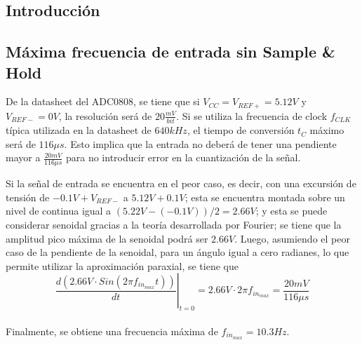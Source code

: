 



\subsection{Introducción}

\subsection{Máxima frecuencia de entrada sin Sample \& Hold}

De la datasheet del ADC0808, se tiene que si $V_{CC} = V_{REF+} = 5.12V$ y $V_{REF-} = 0V$, la resolución será de $20 \frac{mV}{bit}$. Si se utiliza la frecuencia de clock $f_{CLK}$ típica utilizada en la datasheet de $640kHz$, el tiempo de conversión $t_C$ máximo será de $116\mu s$. Esto implica que la entrada no deberá de tener una pendiente mayor a $\frac{20mV}{116\mu s}$ para no introducir error en la cuantización de la señal.


Si la señal de entrada se encuentra en el peor caso, es decir, con una excursión de tensión de $-0.1V + V_{REF-}$ a $5.12V + 0.1V$; esta se encuentra montada sobre un nivel de continua igual a $(5.22V - (-0.1V))/2 = 2.66V$; y esta se puede considerar senoidal gracias a la teoría desarrollada por Fourier; se tiene que la amplitud pico máxima de la senoidal podrá ser $2.66V$. Luego, asumiendo el peor caso de la pendiente de la senoidal, para un ángulo igual a cero radianes, lo que permite utilizar la aproximación paraxial, se tiene que
\\

\begin{equation}
\left. \frac{d \left( 2.66V \cdot Sin \left( 2\pi f_{in_{max}} t \right) \right)}{dt} \right|_{t=0} = 2.66V \cdot 2\pi f_{in_{max}} = \frac{20mV}{116\mu s}
\end{equation}
\\

Finalmente, se obtiene una frecuencia máxima de $f_{in_{max}} = 10.3Hz$.
